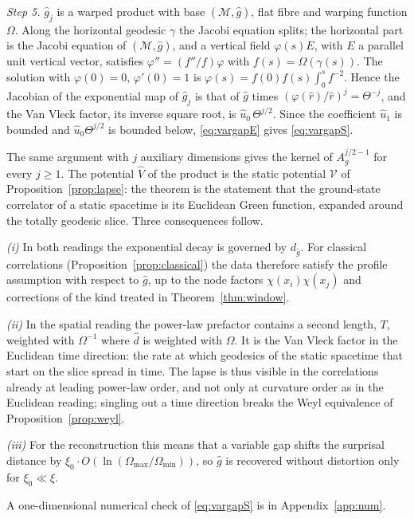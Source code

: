 \documentclass[11pt,a4paper]{article}
\makeatletter
\theoremstyle{stmt}
\theoremstyle{defn}
\theoremstyle{rmk}
\renewenvironment{proof}[1][\proofname]{\par\pushQED{\qed}\normalfont\topsep6\p@\@plus6\p@\relax
  \trivlist\item[\hskip\labelsep{\sffamily\itshape\small #1.}]\ignorespaces}{\popQED\endtrivlist\@endpefalse}
\numberwithin{equation}{section}
\newcommand{\M}{\mathcal{M}}
\makeatother
\begin{document}
\begin{proof}
\emph{Step 5.} $\hat g_j$ is a warped product with base $(\M,\hat g)$, flat fibre and warping function $\Omega$. Along the horizontal geodesic $\gamma$ the Jacobi equation splits; the horizontal part is the Jacobi equation of $(\M,\hat g)$, and a vertical field $\varphi(s)E$, with $E$ a parallel unit vertical vector, satisfies $\varphi''=(f''/f)\varphi$ with $f(s)=\Omega(\gamma(s))$. The solution with $\varphi(0)=0$, $\varphi'(0)=1$ is $\varphi(s)=f(0)f(s)\int_0^sf^{-2}$. Hence the Jacobian of the exponential map of $\hat g_j$ is that of $\hat g$ times $(\varphi(\hat r)/\hat r)^j=\Theta^{-j}$, and the Van Vleck factor, its inverse square root, is $\hat u_0\,\Theta^{j/2}$. Since the coefficient $\hat u_1$ is bounded and $\hat u_0\Theta^{j/2}$ is bounded below, \eqref{eq:vargapE} gives \eqref{eq:vargapS}.
\end{proof}

The same argument with $j$ auxiliary dimensions gives the kernel of $A_g^{j/2-1}$ for every $j\ge1$. The potential $\hat V$ of the product is the static potential $\mathcal V$ of Proposition~\ref{prop:lapse}: the theorem is the statement that the ground-state correlator of a static spacetime is its Euclidean Green function, expanded around the totally geodesic slice. Three consequences follow.

\emph{(i)} In both readings the exponential decay is governed by $d_{\hat g}$. For classical correlations (Proposition~\ref{prop:classical}) the data therefore satisfy the profile assumption with respect to $\hat g$, up to the node factors $\chi(x_i)\chi(x_j)$ and corrections of the kind treated in Theorem~\ref{thm:window}.

\emph{(ii)} In the spatial reading the power-law prefactor contains a second length, $T$, weighted with $\Omega^{-1}$ where $\hat d$ is weighted with $\Omega$. It is the Van Vleck factor in the Euclidean time direction: the rate at which geodesics of the static spacetime that start on the slice spread in time. The lapse is thus visible in the correlations already at leading power-law order, and not only at curvature order as in the Euclidean reading; singling out a time direction breaks the Weyl equivalence of Proposition~\ref{prop:weyl}.

\emph{(iii)} For the reconstruction this means that a variable gap shifts the surprisal distance by $\xi_0\cdot O(\ln(\Omega_{\max}/\Omega_{\min}))$, so $\hat g$ is recovered without distortion only for $\xi_0\ll\xi$.

A one-dimensional numerical check of \eqref{eq:vargapS} is in Appendix~\ref{app:num}.
\end{document}
